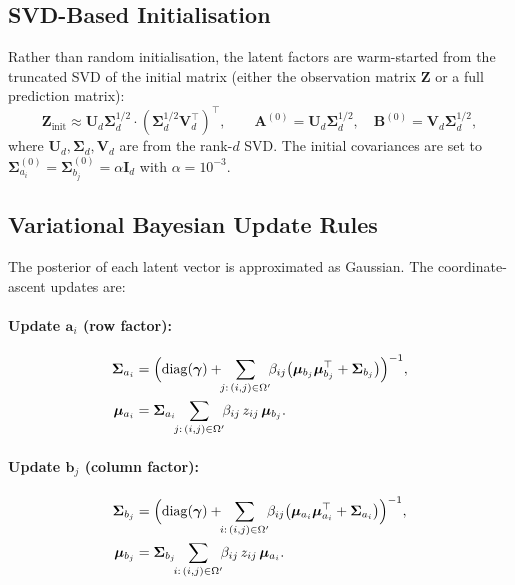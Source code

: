 \documentclass[11pt,a4paper]{article}
\newcommand{\diag}{\mathrm{diag}}
\begin{document}
\subsection{SVD-Based Initialisation}
Rather than random initialisation, the latent factors are warm-started from the truncated SVD of the initial matrix (either the observation matrix $\bm{Z}$ or a full prediction matrix):
\begin{equation}
  \bm{Z}_{\text{init}} \approx \bm{U}_d \bm{\Sigma}_d^{1/2} \cdot (\bm{\Sigma}_d^{1/2} \bm{V}_d^\top)^\top,
  \qquad
  \bm{A}^{(0)} = \bm{U}_d \bm{\Sigma}_d^{1/2},\quad
  \bm{B}^{(0)} = \bm{V}_d \bm{\Sigma}_d^{1/2},
\end{equation}
where $\bm{U}_d, \bm{\Sigma}_d, \bm{V}_d$ are from the rank-$d$ SVD. The initial covariances are set to $\bm{\Sigma}_{a_i}^{(0)} = \bm{\Sigma}_{b_j}^{(0)} = \alpha \bm{I}_d$ with $\alpha = 10^{-3}$.

\subsection{Variational Bayesian Update Rules}
The posterior of each latent vector is approximated as Gaussian. The coordinate-ascent updates are:

\paragraph{Update $\bm{a}_i$ (row factor):}
\begin{align}
  \bm{\Sigma}_{a_i} &= \Bigl(\diag(\bm{\gamma})
    + \!\!\sum_{j:\,(i,j)\in\Omega'}\!\! \beta_{ij}\bigl(\bm{\mu}_{b_j} \bm{\mu}_{b_j}^\top + \bm{\Sigma}_{b_j}\bigr)\Bigr)^{-1}, \label{eq:sigma_a}\\
  \bm{\mu}_{a_i} &= \bm{\Sigma}_{a_i} \!\!\sum_{j:\,(i,j)\in\Omega'}\!\! \beta_{ij}\, z_{ij}\, \bm{\mu}_{b_j}. \label{eq:mu_a}
\end{align}

\paragraph{Update $\bm{b}_j$ (column factor):}
\begin{align}
  \bm{\Sigma}_{b_j} &= \Bigl(\diag(\bm{\gamma})
    + \!\!\sum_{i:\,(i,j)\in\Omega'}\!\! \beta_{ij}\bigl(\bm{\mu}_{a_i} \bm{\mu}_{a_i}^\top + \bm{\Sigma}_{a_i}\bigr)\Bigr)^{-1}, \label{eq:sigma_b}\\
  \bm{\mu}_{b_j} &= \bm{\Sigma}_{b_j} \!\!\sum_{i:\,(i,j)\in\Omega'}\!\! \beta_{ij}\, z_{ij}\, \bm{\mu}_{a_i}. \label{eq:mu_b}
\end{align}
\end{document}
